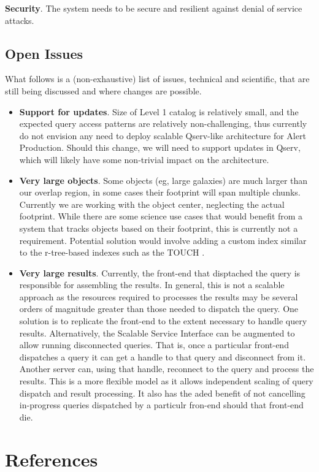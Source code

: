 \documentclass[DM,lsstdraft,toc]{lsstdoc}
\begin{document}
\textbf{Security}. The system needs to be secure and resilient against
denial of service attacks.

\subsection{Open Issues}\label{open-issues}

What follows is a (non-exhaustive) list of issues, technical and
scientific, that are still being discussed and where changes are
possible.

\begin{itemize}
\item
  \textbf{Support for updates}. Size of Level 1 catalog is relatively
  small, and the expected query access patterns are relatively
  non-challenging, thus currently do not envision any need to deploy
  scalable Qserv-like architecture for Alert Production. Should this
  change, we will need to support updates in Qserv, which will likely
  have some non-trivial impact on the architecture.
\item
  \textbf{Very large objects}. Some objects (eg, large galaxies) are
  much larger than our overlap region, in some cases their footprint
  will span multiple chunks. Currently we are working with the object
  center, neglecting the actual footprint. While there are some science
  use cases that would benefit from a system that tracks objects based
  on their footprint, this is currently not a requirement. Potential
  solution would involve adding a custom index similar to the
  r-tree-based indexes such as the TOUCH \citep{Nobari:2013:TIS:2463676.2463700}.
\item
  \textbf{Very large results}. Currently, the front-end that disptached
  the query is responsible for assembling the results. In general, this
  is not a scalable approach as the resources required to processes the
  results may be several orders of magnitude greater than those needed
  to dispatch the query. One solution is to replicate the front-end to
  the extent necessary to handle query results. Alternatively, the
  Scalable Service Interface can be augmented to allow running
  disconnected queries. That is, once a particular front-end dispatches
  a query it can get a handle to that query and disconnect from it.
  Another server can, using that handle, reconnect to the query and
  process the results. This is a more flexible model as it allows
  independent scaling of query dispatch and result processing. It also
  has the aded benefit of not cancelling in-progress queries dispatched
  by a particulr fron-end should that front-end die.
\end{itemize}

\section{References}\label{references}
\renewcommand{\refname}{}

\end{document}
